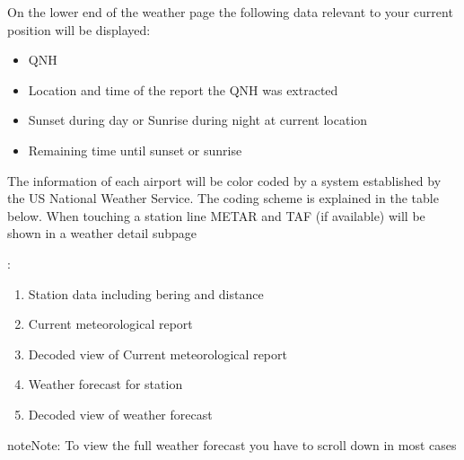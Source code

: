 \documentclass[letterpaper,10pt,english]{sphinxmanual}
\begin{document}
\sphinxAtStartPar
On the lower end of the weather page the following data relevant to your current position will be displayed:
\begin{itemize}
\item {} 
\sphinxAtStartPar
QNH

\item {} 
\sphinxAtStartPar
Location and time of the report the QNH was extracted

\item {} 
\sphinxAtStartPar
Sunset during day or Sunrise during night at current location

\item {} 
\sphinxAtStartPar
Remaining time until sunset or sunrise

\end{itemize}

\sphinxAtStartPar
The information of each airport will be color coded by a system established by the US National Weather Service. The coding scheme is explained in the table below.
When touching a station line METAR and TAF (if available) will be shown in a weather detail sub\sphinxhyphen{}page

\begin{figure}[htbp]
\centering

\noindent{}
\end{figure}

\sphinxAtStartPar
{}:
\begin{enumerate}
%
\item {} 
\sphinxAtStartPar
Station data including bering and distance

\item {} 
\sphinxAtStartPar
Current meteorological report

\item {} 
\sphinxAtStartPar
Decoded view of Current meteorological report

\item {} 
\sphinxAtStartPar
Weather forecast for station

\item {} 
\sphinxAtStartPar
Decoded view of weather forecast

\end{enumerate}

\begin{sphinxadmonition}{note}{Note:}
\sphinxAtStartPar
To view the full weather forecast you have to scroll down in most cases
\end{sphinxadmonition}
\end{document}
